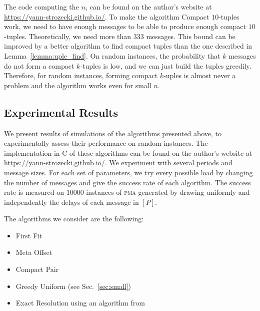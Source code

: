\documentclass[a4paper,UKenglish,cleveref, autoref, thm-restate]{lipics-v2019}
\newcommand\pma{\textsc{pma}\xspace}
\begin{document}
The code computing the $n_i$ can be found on the author's website at \url{https://yann-strozecki.github.io/}.
To make the algorithm Compact $10$-tuples work, we need to have enough messages to be able to
produce enough compact $10$-tuples. Theoretically, we need more than $333$ messages. This bound can be improved
by a better algorithm to find compact tuples than the one described in Lemma~\ref{lemma:uple_find}. On random instances, the probability that $k$ messages do not form a compact $k$-tuples is low, and we can just build the tuples greedily. Therefore, for random instances, forming compact $k$-uples is almost never a problem and the algorithm works even for small $n$.

\subsection{Experimental Results} \label{sec:perf_large}

We present results of simulations of the algorithms presented above, to experimentally assess their performance on
random instances. The implementation in C of these algorithms can be found on the author's website at \url{https://yann-strozecki.github.io/}. We experiment with several periods and message sizes. For each set of parameters, we try every possible load by changing the number of messages and give the success rate of each algorithm. The success rate is measured on $10000$ instances of \pma generated by drawing uniformly and independently the delays of each message in $[P]$. 

The algorithms we consider are the following:
\begin{itemize}
	\item First Fit
	\item Meta Offset
	\item Compact Pair
	\item Greedy Uniform (see Sec.~\ref{sec:small})
	\item Exact Resolution using an algorithm from~\cite{dominique2018deterministic}  
\end{itemize}
\end{document}
